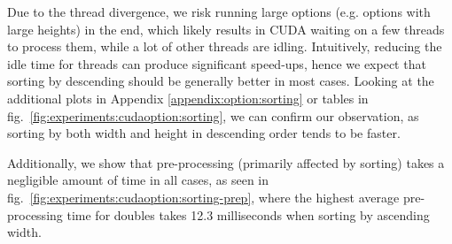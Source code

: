 Due to the thread divergence, we risk running large options (e.g. options with large heights) in the end, which likely results in CUDA waiting on a few threads to process them, while a lot of other threads are idling. Intuitively, reducing the idle time for threads can produce significant speed-ups, hence we expect that sorting by descending should be generally better in most cases. Looking at the additional plots in Appendix \ref{appendix:option:sorting} or tables in fig.~\ref{fig:experiments:cudaoption:sorting}, we can confirm our observation, as sorting by both width and height in descending order tends to be faster. 

Additionally, we show that pre-processing (primarily affected by sorting) takes a negligible amount of time in all cases, as seen in fig.~\ref{fig:experiments:cudaoption:sorting-prep}, where the highest average pre-processing time for doubles takes 12.3 milliseconds when sorting by ascending width. 

